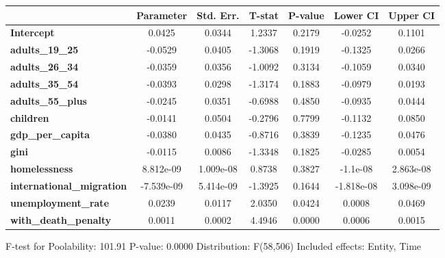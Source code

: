 \begin{center}
\begin{tabular}{lclc}
\bottomrule
\end{tabular}
\begin{tabular}{lcccccc}
                                  & \textbf{Parameter} & \textbf{Std. Err.} & \textbf{T-stat} & \textbf{P-value} & \textbf{Lower CI} & \textbf{Upper CI}  \\
\midrule
\textbf{Intercept}                &       0.0425       &       0.0344       &      1.2337     &      0.2179      &      -0.0252      &       0.1101       \\
\textbf{adults\_19\_25}           &      -0.0529       &       0.0405       &     -1.3068     &      0.1919      &      -0.1325      &       0.0266       \\
\textbf{adults\_26\_34}           &      -0.0359       &       0.0356       &     -1.0092     &      0.3134      &      -0.1059      &       0.0340       \\
\textbf{adults\_35\_54}           &      -0.0393       &       0.0298       &     -1.3174     &      0.1883      &      -0.0979      &       0.0193       \\
\textbf{adults\_55\_plus}         &      -0.0245       &       0.0351       &     -0.6988     &      0.4850      &      -0.0935      &       0.0444       \\
\textbf{children}                 &      -0.0141       &       0.0504       &     -0.2796     &      0.7799      &      -0.1132      &       0.0850       \\
\textbf{gdp\_per\_capita}         &      -0.0380       &       0.0435       &     -0.8716     &      0.3839      &      -0.1235      &       0.0476       \\
\textbf{gini}                     &      -0.0115       &       0.0086       &     -1.3348     &      0.1825      &      -0.0285      &       0.0054       \\
\textbf{homelessness}             &     8.812e-09      &     1.009e-08      &      0.8738     &      0.3827      &      -1.1e-08     &     2.863e-08      \\
\textbf{international\_migration} &     -7.539e-09     &     5.414e-09      &     -1.3925     &      0.1644      &     -1.818e-08    &     3.098e-09      \\
\textbf{unemployment\_rate}       &       0.0239       &       0.0117       &      2.0350     &      0.0424      &       0.0008      &       0.0469       \\
\textbf{with\_death\_penalty}     &       0.0011       &       0.0002       &      4.4946     &      0.0000      &       0.0006      &       0.0015       \\
\bottomrule
\end{tabular}
\end{center}

F-test for Poolability: 101.91 \newline
 P-value: 0.0000 \newline
 Distribution: F(58,506) \newline
  \newline
 Included effects: Entity, Time